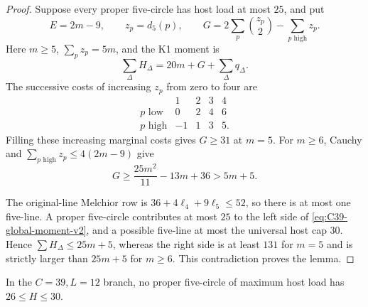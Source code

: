 \begin{proof}
Suppose every proper five-circle has host load at most \(25\), and put
\[
 E=2m-9,\qquad z_p=d_5(p),\qquad
 G=2\sum_p\binom{z_p}{2}-\sum_{p\text{ high}}z_p.
\]
Here \(m\ge5\), \(\sum_pz_p=5m\), and the K1 moment is
\begin{equation}\label{eq:C39-global-moment-v2}
 \sum_\Delta H_\Delta=20m+G+\sum_\Delta q_\Delta.
\end{equation}
The successive costs of increasing \(z_p\) from zero to four are
\[
 \begin{array}{c|rrrr}
 &1&2&3&4\\ \hline
 p\text{ low}&0&2&4&6\\
 p\text{ high}&-1&1&3&5.
 \end{array}
\]
Filling these increasing marginal costs gives \(G\ge31\) at \(m=5\).
For \(m\ge6\), Cauchy and
\(\sum_{p\text{ high}}z_p\le4(2m-9)\) give
\[
 G\ge\frac{25m^2}{11}-13m+36>5m+5.
\]

The original-line Melchior row is
\(36+4\ell_4+9\ell_5\le52\), so there is at most one five-line.  A proper
five-circle contributes at most \(25\) to the left side of
\eqref{eq:C39-global-moment-v2}, and a possible five-line at most the
universal host cap \(30\).  Hence \(\sum H_\Delta\le25m+5\), whereas the
right side is at least \(131\) for \(m=5\) and is strictly larger than
\(25m+5\) for \(m\ge6\).  This contradiction proves the lemma.
\end{proof}

\begin{lemma}[The \(L=12\) maximum-host router]
\label{lem:n11-C39-maxhost-v2}
In the \(C=39,L=12\) branch, no proper five-circle of maximum host load has
\(26\le H\le30\).
\end{lemma}

